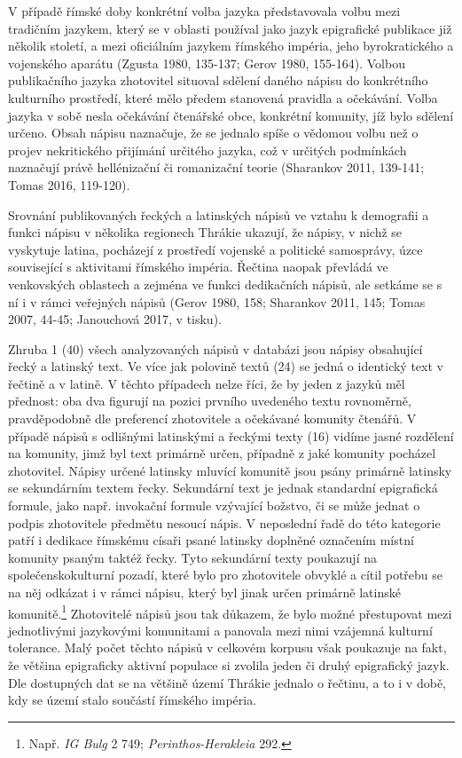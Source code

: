 V případě římské doby konkrétní volba jazyka představovala volbu mezi tradičním jazykem, který se v oblasti používal jako jazyk epigrafické publikace již několik století, a mezi oficiálním jazykem římského impéria, jeho byrokratického a vojenského aparátu (Zgusta 1980, 135-137; Gerov 1980, 155-164). Volbou publikačního jazyka zhotovitel situoval sdělení daného nápisu do konkrétního kulturního prostředí, které mělo předem stanovená pravidla a očekávání. Volba jazyka v sobě nesla očekávání čtenářské obce, konkrétní komunity, jíž bylo sdělení určeno. Obsah nápisu naznačuje, že se jednalo spíše o vědomou volbu než o projev nekritického přijímání určitého jazyka, což v určitých podmínkách naznačují právě hellénizační či romanizační teorie (Sharankov 2011, 139-141; Tomas 2016, 119-120).

Srovnání publikovaných řeckých a latinských nápisů ve vztahu k demografii a funkci nápisu v několika regionech Thrákie ukazují, že nápisy, v nichž se vyskytuje latina, pocházejí z prostředí vojenské a politické samosprávy, úzce související s aktivitami římského impéria. Řečtina naopak převládá ve venkovských oblastech a zejména ve funkci dedikačních nápisů, ale setkáme se s ní i v rámci veřejných nápisů (Gerov 1980, 158; Sharankov 2011, 145; Tomas 2007, 44-45; Janouchová 2017, v tisku).

Zhruba 1  (40) všech analyzovaných nápisů v databázi jsou nápisy obsahující řecký a latinský text. Ve více jak polovině textů (24) se jedná o identický text v řečtině a v latině. V těchto případech nelze říci, že by jeden z jazyků měl přednost: oba dva figurují na pozici prvního uvedeného textu rovnoměrně, pravděpodobně dle preferencí zhotovitele a očekávané komunity čtenářů. V případě nápisů s odlišnými latinskými a řeckými texty (16) vidíme jasné rozdělení na komunity, jimž byl text primárně určen, případně z jaké komunity pocházel zhotovitel. Nápisy určené latinsky mluvící komunitě jsou psány primárně latinsky se sekundárním textem řecky. Sekundární text je jednak standardní epigrafická formule, jako např. invokační formule vzývající božstvo, či se může jednat o podpis zhotovitele předmětu nesoucí nápis. V neposlední řadě do této kategorie patří i dedikace římskému císaři psané latinsky doplněné označením místní komunity psaným taktéž řecky. Tyto sekundární texty poukazují na společenskokulturní pozadí, které bylo pro zhotovitele obvyklé a cítil potřebu se na něj odkázat i v rámci nápisu, který byl jinak určen primárně latinské komunitě.\footnote{Např. {\em IG Bulg} 2 749; {\em Perinthos-Herakleia} 292.} Zhotovitelé nápisů jsou tak důkazem, že bylo možné přestupovat mezi jednotlivými jazykovými komunitami a panovala mezi nimi vzájemná kulturní tolerance. Malý počet těchto nápisů v celkovém korpusu však poukazuje na fakt, že většina epigraficky aktivní populace si zvolila jeden či druhý epigrafický jazyk. Dle dostupných dat se na většině území Thrákie jednalo o řečtinu, a to i v době, kdy se území stalo součástí římského impéria.

